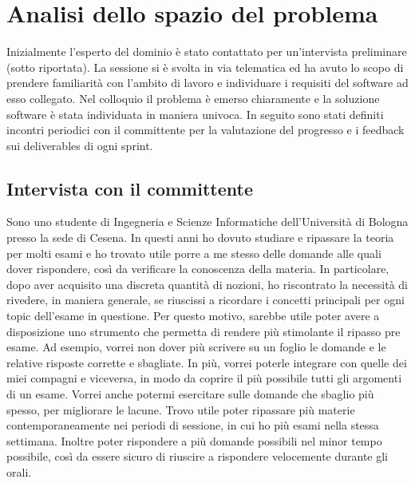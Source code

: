 \chapter{Analisi dello spazio del problema}

Inizialmente l'esperto del dominio è stato contattato per un'intervista preliminare (sotto riportata).
La sessione si è svolta in via telematica ed ha avuto lo scopo di prendere familiarità con l'ambito di lavoro e individuare i requisiti del software ad esso collegato. 
Nel colloquio il problema è emerso chiaramente e la soluzione software è stata individuata in maniera univoca.
In seguito sono stati definiti incontri periodici con il committente per la valutazione del progresso e i feedback sui deliverables di ogni sprint.

	\section{Intervista con il committente}
        \label{chap: IntervistaCommittente}
    
    Sono uno studente di Ingegneria e Scienze Informatiche dell'Università di Bologna presso la sede di Cesena. In questi anni ho dovuto studiare e ripassare la teoria per molti esami e ho trovato utile porre a me stesso delle domande alle quali dover rispondere, così da verificare la conoscenza della materia.
    In particolare, dopo aver acquisito una discreta quantità di nozioni, ho riscontrato la necessità di rivedere, in maniera generale, se riuscissi a ricordare i concetti principali per ogni topic dell'esame in questione.
    Per questo motivo, sarebbe utile poter avere a disposizione uno strumento che permetta di rendere più stimolante il ripasso pre esame. Ad esempio, vorrei non dover più scrivere su un foglio le domande e le relative risposte corrette e sbagliate. In più, vorrei poterle integrare con quelle dei miei compagni e viceversa, in modo da coprire il più possibile tutti gli argomenti di un esame. Vorrei anche potermi esercitare sulle domande che sbaglio più spesso, per migliorare le lacune. Trovo utile poter ripassare più materie contemporaneamente nei periodi di sessione, in cui ho più esami nella stessa settimana. Inoltre poter rispondere a più domande possibili nel minor tempo possibile, così da essere sicuro di riuscire a rispondere velocemente durante gli orali.
    
